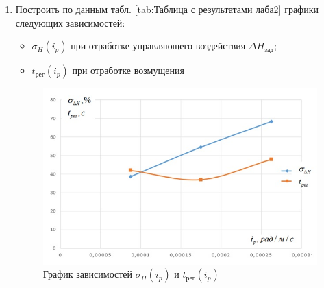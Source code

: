 \begin{enumerate}
                            
                        \item Построить по данным табл. \ref{tab:Таблица с результатами лаба2} графики следующих зависимостей:
                            \begin{itemize}
                                \item  $\sigma_{H}(i_p)$ при отработке управляющего воздействия $\Delta H_{\text{зад}}$;
                                \item  $t_{\text{рег}}(i_p)$  при отработке возмущения
                            \end{itemize}
                            \begin{figure}[H]
                                \centering
                                \includegraphics[widht=\linewidth]{img/10.jpg}
                                \caption{График зависимостей $\sigma_{H}(i_p)$ и $t_{\text{рег}}(i_p)$ }
                                \label{fig:my_label}
                            \end{figure}
                            

\end{enumerate}
